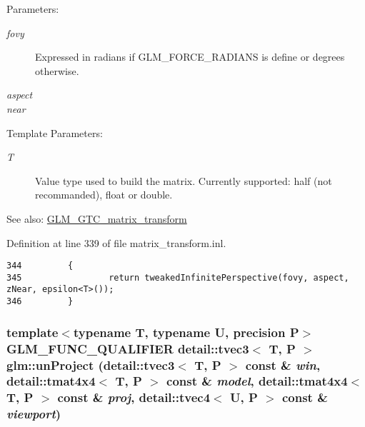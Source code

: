 \begin{Desc}
\item[Parameters:]
\begin{description}
\item[{\em fovy}]Expressed in radians if GLM\_\-FORCE\_\-RADIANS is define or degrees otherwise. \item[{\em aspect}]\item[{\em near}]\end{description}
\end{Desc}
\begin{Desc}
\item[Template Parameters:]
\begin{description}
\item[{\em T}]Value type used to build the matrix. Currently supported: half (not recommanded), float or double. \end{description}
\end{Desc}
\begin{Desc}
\item[See also:]\hyperlink{group__gtc__matrix__transform}{GLM\_\-GTC\_\-matrix\_\-transform} \end{Desc}


Definition at line 339 of file matrix\_\-transform.inl.

\begin{Code}\begin{verbatim}344         {
345                 return tweakedInfinitePerspective(fovy, aspect, zNear, epsilon<T>());
346         }
\end{verbatim}
\end{Code}


\hypertarget{group__gtc__matrix__transform_g90b6f19047316d870f88e0a50d8b13f3}{
\subsubsection[unProject]{\setlength{\rightskip}{0pt plus 5cm}template$<$typename T, typename U, precision P$>$ GLM\_\-FUNC\_\-QUALIFIER detail::tvec3$<$ T, P $>$ glm::unProject (detail::tvec3$<$ T, P $>$ const \& {\em win}, \/  detail::tmat4x4$<$ T, P $>$ const \& {\em model}, \/  detail::tmat4x4$<$ T, P $>$ const \& {\em proj}, \/  detail::tvec4$<$ U, P $>$ const \& {\em viewport})}}
\label{group__gtc__matrix__transform_g90b6f19047316d870f88e0a50d8b13f3}


